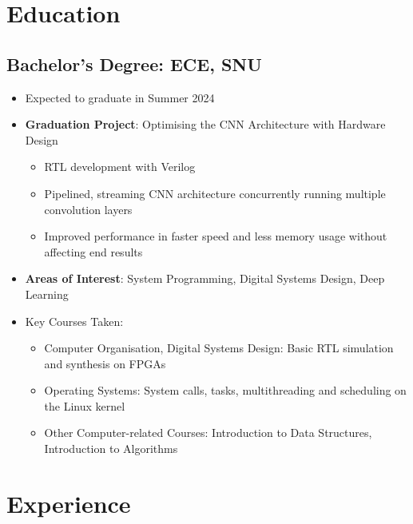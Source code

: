 \documentclass[10pt]{article}
\begin{document}
\newpage
\restoregeometry
\pagestyle{stylemain}

\section*{Education}

\subsection*{Bachelor's Degree: ECE, SNU}
\begin{itemize}
  \item Expected to graduate in Summer 2024
  \item \textbf{Graduation Project}: Optimising the CNN Architecture with
    Hardware Design \label{edu:gradproj}
    \begin{itemize}
      \item RTL development with Verilog
      \item Pipelined, streaming CNN architecture concurrently running multiple
        convolution layers
      \item Improved performance in faster speed and less memory usage without
        affecting end results
    \end{itemize}
  \item \textbf{Areas of Interest}: System Programming, Digital Systems Design,
    Deep Learning
  \item[ ] Key Courses Taken:
    \begin{itemize}
      \item Computer Organisation, Digital Systems Design: Basic RTL simulation
        and synthesis on FPGAs
      \item Operating Systems: System calls, tasks, multithreading and
        scheduling on the Linux kernel
      \item Other Computer-related Courses: Introduction to Data Structures,
        Introduction to Algorithms
    \end{itemize}
\end{itemize}

\section*{Experience}
\end{document}
